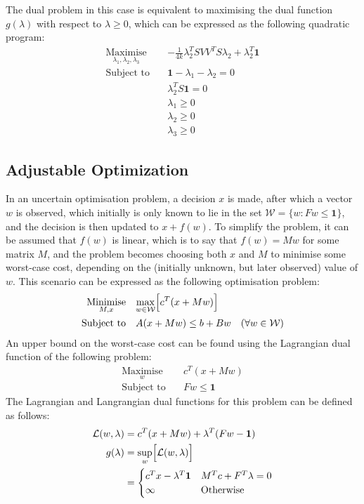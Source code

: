 The dual problem in this case is equivalent to maximising the dual function $g(\lambda)$ with respect to $\lambda\ge0$, which can be expressed as the following quadratic program:
\begin{align*}
    \underset{\lambda_1, \lambda_2, \lambda_3}{\text{Maximise}} \quad & -\frac{1}{4k}\lambda_2^TSVV^TS\lambda_2 + \lambda_2^T\mathbf{1} \\
    \text{Subject to} \quad & \mathbf{1} - \lambda_1 - \lambda_2 = 0 \\
    & \lambda_2^TS\mathbf{1} = 0 \\
    & \lambda_1 \ge 0 \\
    & \lambda_2 \ge 0 \\
    & \lambda_3 \ge 0
\end{align*}

\subsection{Adjustable Optimization}
In an uncertain optimisation problem, a decision $x$ is made, after which a vector $w$ is observed, which initially is only known to lie in the set $\mathcal{W} = \{ w: Fw \le \mathbf{1} \}$, and the decision is then updated to $x + f(w)$. To simplify the problem, it can be assumed that $f(w)$ is linear, which is to say that $f(w) = Mw$ for some matrix $M$, and the problem becomes choosing both $x$ and $M$ to minimise some worst-case cost, depending on the (initially unknown, but later observed) value of $w$. This scenario can be expressed as the following optimisation problem:
\begin{align*}
    \underset{M, x}{\text{Minimise}} \quad & \underset{w\in\mathcal{W}}{\max}\Bigl[ c^T(x + Mw) \Bigr] \\
    \text{Subject to} \quad & A(x + Mw) \le b + Bw \quad (\forall w\in\mathcal{W})
\end{align*}
An upper bound on the worst-case cost can be found using the Lagrangian dual function of the following problem:
\begin{align*}
    \underset{w}{\text{Maximise}} \quad & c^T(x + Mw) \\
    \text{Subject to} \quad & Fw \le \mathbf{1}
\end{align*}
The Lagrangian and Langrangian dual functions for this problem can be defined as follows:
\begin{align*}
    \mathcal{L}(w, \lambda) &= c^T(x + Mw) + \lambda^T(Fw - \mathbf{1}) \\
    g(\lambda) &= \underset{w}{\sup}\Bigl[\mathcal{L}(w, \lambda)\Bigr] \\
    &= \begin{cases}
        c^Tx - \lambda^T\mathbf{1} & M^Tc + F^T\lambda = 0 \\
        \infty & \text{Otherwise}
    \end{cases}
\end{align*}
